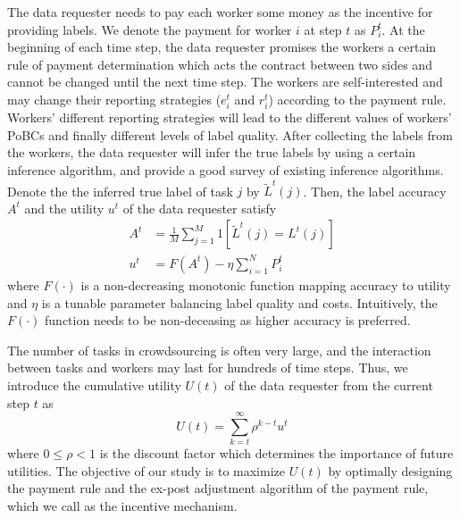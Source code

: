 The data requester needs to pay each worker some money as the incentive for providing labels.
We denote the payment for worker $i$ at step $t$ as $P^{t}_{i}$.
At the beginning of each time step, the data requester promises the workers a certain rule of payment determination which acts the contract between two sides and cannot be changed until the next time step.
The workers are self-interested and may change their reporting strategies ($e^t_i$ and $r^t_i$) according to the payment rule.
Workers' different reporting strategies will lead to the different values of workers' PoBCs and finally different levels of label quality.
After collecting the labels from the workers, the data requester will infer the true labels by using a certain inference algorithm, and \cite{zheng2017truth} provide a good survey of existing inference algorithms.
Denote the the inferred true label of task $j$ by $\tilde{L}^{t}(j)$.
Then, the label accuracy $A^t$ and the utility $u^t$ of the data requester satisfy
\begin{equation}
\label{utility}
\begin{split}
A^t&=\frac{1}{M}{\sum}_{j=1}^{M}1\left[\tilde{L}^{t}(j)=L^{t}(j)\right]\\
u^t &= F(A^t) - \eta {\sum}_{i=1}^{N}P^t_i
\end{split}
\end{equation}
where $F(\cdot)$ is a non-decreasing monotonic function mapping accuracy to utility and $\eta$ is a
tunable parameter balancing label quality and costs. Intuitively, the $F(\cdot)$ function needs to be non-deceasing as higher accuracy is preferred.

The number of tasks in crowdsourcing is often very large, and the interaction between tasks and workers may last for hundreds of time steps.
Thus, we introduce the cumulative utility $U(t)$ of the data requester from the current step $t$ as
\begin{equation}
U(t)={\sum}_{k=t}^{\infty}\rho^{k-t}u^t
\end{equation}
where $0\leq \rho< 1$ is the discount factor which determines the importance of future utilities.
The objective of our study is to maximize $U(t)$ by optimally designing the payment rule and the ex-post adjustment algorithm of the payment rule, which we call as the incentive mechanism.